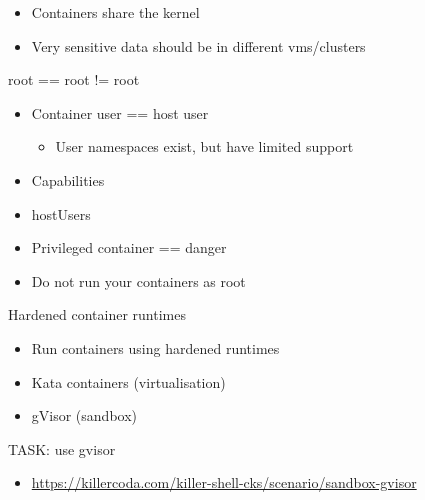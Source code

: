 \documentclass{dcpresentation}
\begin{document}
\begin{frame}
\end{frame}

\begin{frame}
  \begin{itemize}
  \item Containers share the kernel
  \item \alert{Very sensitive data should be in different vms/clusters}
  \end{itemize}
\end{frame}

\begin{frame}{root == root != root}
  \begin{itemize}
  \item Container user == host user
    \begin{itemize}
    \item User namespaces exist, but have limited support
    \end{itemize}
  \item Capabilities
  \item hostUsers
  \item Privileged container == danger
  \item<2> \alert{Do not run your containers as root}
  \end{itemize}
\end{frame}



\begin{frame}{Hardened container runtimes}
  \begin{itemize}
  \item Run containers using hardened runtimes
  \item Kata containers (virtualisation)
  \item gVisor (sandbox)
  \end{itemize}
\end{frame}

\begin{frame}{TASK: use gvisor}
 \begin{itemize}
  \item \url{https://killercoda.com/killer-shell-cks/scenario/sandbox-gvisor}
 \end{itemize}
\end{frame}
\end{document}
